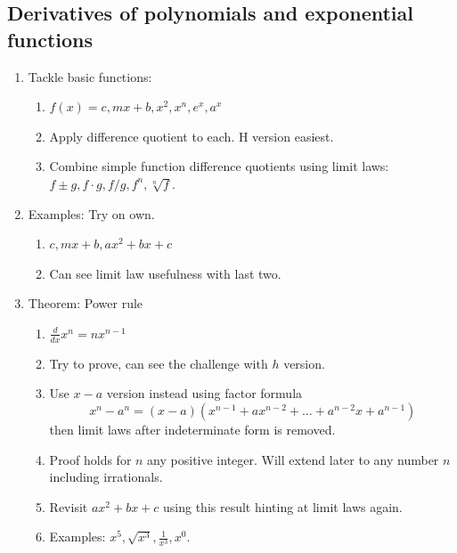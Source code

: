 \documentclass{article}
\begin{document}
\subsection{Derivatives of polynomials and exponential functions}
\begin{enumerate}

\item Tackle basic functions:
\begin{enumerate}
\item $f(x)= c, mx+b, x^2, x^n, e^x, a^x$
\item Apply difference quotient to each. H version easiest.
\item Combine simple function difference quotients using limit laws: $f \pm g, f \cdot g, f/g, f^n, \sqrt[n]{f}$. 
\end{enumerate}


\item Examples: Try on own.
\begin{enumerate}
\item $c, mx+b, ax^2+bx+c$
\item Can see limit law usefulness with last two.
\end{enumerate}

\item Theorem: Power rule
\begin{enumerate}
\item $\frac{d}{dx} x^n = nx^{n-1}$
\item Try to prove, can see the challenge with $h$ version.
\item Use $x-a$ version instead using factor formula
\[
x^n-a^n = (x-a)(x^{n-1} + ax^{n-2} + \dots + a^{n-2}x + a^{n-1})
\]
then limit laws after indeterminate form is removed.
\item Proof holds for $n$ any positive integer. Will extend later to any number $n$ including irrationals.
\item Revisit $ax^2+bx+c$ using this result hinting at limit laws again.
\item Examples: $x^5, \sqrt{x^3}, \frac{1}{x^3}, x^0$.
\end{enumerate}


\end{enumerate}
\end{document}
